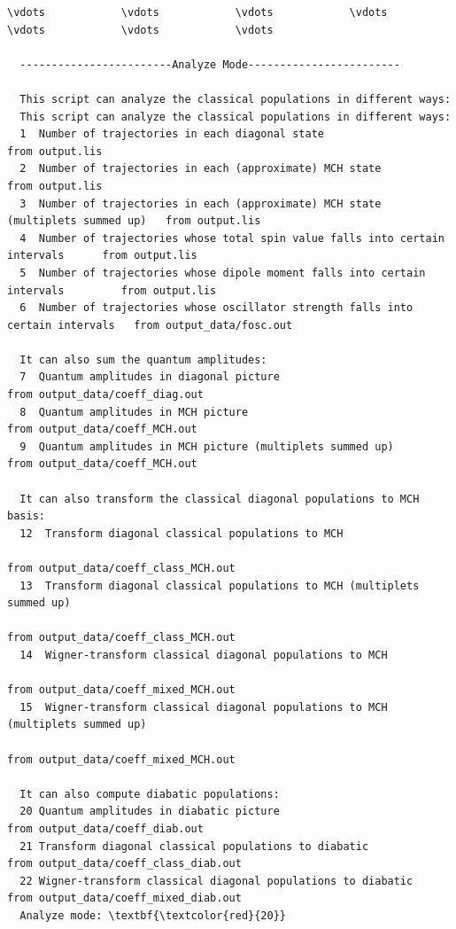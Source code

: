 \documentclass[a4paper,11pt,DIV=15,openany]{scrbook}
\begin{document}
\begin{oframed}
  \footnotesize\begin{Verbatim}[commandchars=\\\{\}]
  \vdots            \vdots            \vdots            \vdots            \vdots            \vdots            \vdots            
  
  ------------------------Analyze Mode------------------------
  
  This script can analyze the classical populations in different ways:
  This script can analyze the classical populations in different ways:
  1  Number of trajectories in each diagonal state                                   from output.lis
  2  Number of trajectories in each (approximate) MCH state                          from output.lis
  3  Number of trajectories in each (approximate) MCH state (multiplets summed up)   from output.lis
  4  Number of trajectories whose total spin value falls into certain intervals      from output.lis
  5  Number of trajectories whose dipole moment falls into certain intervals         from output.lis
  6  Number of trajectories whose oscillator strength falls into certain intervals   from output_data/fosc.out
  
  It can also sum the quantum amplitudes:
  7  Quantum amplitudes in diagonal picture                                    from output_data/coeff_diag.out
  8  Quantum amplitudes in MCH picture                                         from output_data/coeff_MCH.out
  9  Quantum amplitudes in MCH picture (multiplets summed up)                  from output_data/coeff_MCH.out
  
  It can also transform the classical diagonal populations to MCH basis:
  12  Transform diagonal classical populations to MCH
                                                                          from output_data/coeff_class_MCH.out
  13  Transform diagonal classical populations to MCH (multiplets summed up)
                                                                          from output_data/coeff_class_MCH.out 
  14  Wigner-transform classical diagonal populations to MCH
                                                                          from output_data/coeff_mixed_MCH.out
  15  Wigner-transform classical diagonal populations to MCH (multiplets summed up)
                                                                          from output_data/coeff_mixed_MCH.out
  
  It can also compute diabatic populations:
  20 Quantum amplitudes in diabatic picture                              from output_data/coeff_diab.out
  21 Transform diagonal classical populations to diabatic                from output_data/coeff_class_diab.out
  22 Wigner-transform classical diagonal populations to diabatic         from output_data/coeff_mixed_diab.out
  Analyze mode: \textbf{\textcolor{red}{20}}
  

\end{Verbatim}
\end{oframed}
\end{document}
